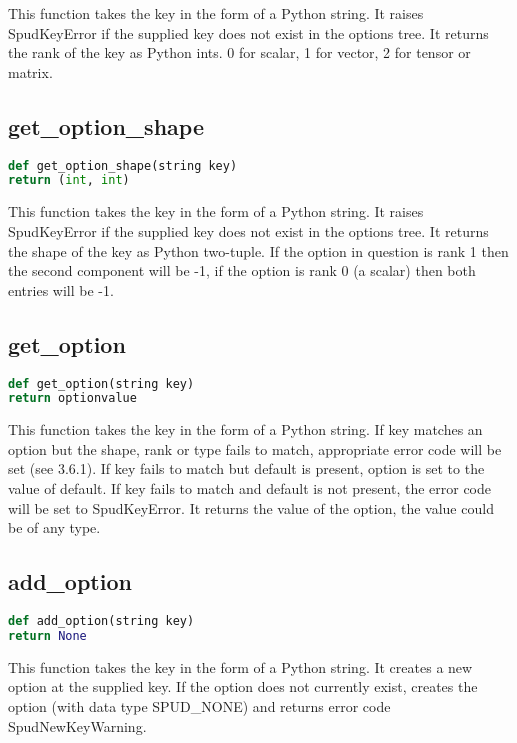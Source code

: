 \documentclass[a4paper, 11pt]{book}
\begin{document}
This function takes the key in the form of a Python string. 
It raises SpudKeyError if the supplied key does not exist in the options tree.
It returns the rank of the key as Python ints.
0 for scalar, 1 for vector, 2 for tensor or matrix.

\subsection{get\_option\_shape}

\begin{lstlisting}[language=Python]
def get_option_shape(string key)
return (int, int)
\end{lstlisting}

This function takes the key in the form of a Python string. 
It raises SpudKeyError if the supplied key does not exist in the options tree.
It returns the shape of the key as Python two-tuple.
If the option in question is rank 1 then the second component will be -1, if the option is rank 0 (a scalar) then both entries will be -1.

\subsection{get\_option}

\begin{lstlisting}[language=Python]
def get_option(string key)
return optionvalue
\end{lstlisting}

This function takes the key in the form of a Python string. 
If key matches an option but the shape, rank or type fails to match, appropriate error code will
be set (see 3.6.1).
If key fails to match but default is present, option is set to the value of default.
If key fails to match and default is not present, the error code will be set to SpudKeyError.
It returns the value of the option, the value could be of any type.

\subsection{add\_option}

\begin{lstlisting}[language=Python]
def add_option(string key)
return None
\end{lstlisting}

This function takes the key in the form of a Python string. 
It creates a new option at the supplied key.
If the option does not currently exist, creates the option
(with data type SPUD\_NONE) and returns error code SpudNewKeyWarning.
\end{document}
